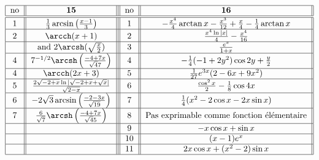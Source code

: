 \[ \begin{tabular}{| c || c || | c | | c | | }
\hline       no &         ${\bf 15}                                          $                                   &  no    &  ${\bf 16}  $                                                                                              \\    \hline \hline
             $1$   &      $      \frac{1}{3}\arcsin \left(\frac{x-1}{3}\right)                  $          & $1$  &  $ -\frac{x^4}{4} \arctan x - \frac{x^3}{12}+\frac{x}{4}-\frac{1}{4}\arctan x$    \\ \hline 
            $2$   &      $      \arcch(x+1)              $                                                     & $2$  &  $\frac{x^4\ln| x|}{4}-\frac{x^4}{16} $          						\\ \hline
                      &   and           $   2\arcsh(\sqrt{\frac{x}{2}}) $         			        & $3$  &  $\frac{e^x}{1+x}$       									\\ \hline 
           $4$   &        $  7^{-1/2}\arcsh\left( \frac{-4+7x}{\sqrt 47} \right)               $                               &  $4$ &  $-\frac{1}{4}(-1+2y^2)\cos 2y + \frac{y}{2}$    					\\ \hline 
         $4$   &      $ \arcch(2x+3)     $       							&  $5$ &  $\frac{1}{27}e^{3x}(2-6x+9x^2)$       				 \\ \hline
           $5$&       $\frac{2\sqrt{-2+x} \ln |\sqrt{-2 + x} +\sqrt{x}| }{\sqrt{2-x}}   $               & $6$  &  $\frac{\cos^2 x}{2}-\frac{1}{8}\cos 4x $        \\ \hline
            $6$   &      $-2\sqrt{3}\arcsin\left(\frac{-2-3x}{\sqrt{19}}\right)$                & $7$  &  $\frac{1}{4}(x^2-2\cos x -2x\sin x) $                \\ \hline
                $7$      &       			     $\frac{6}{\sqrt{7}}\arcsh\left(\frac{-4+7x}{\sqrt 45}\right)$                                                                      & $8$  &  Pas exprimable comme fonction élémentaire             \\ \hline
                   &       			                                                                         & $9$  &   $-x\cos x +\sin x$           \\ \hline
                    &       			                                                                         & $10$ &  $(x-1)e^x$            \\ \hline
                    &       			                                                                         & $11$ &  $2x\cos x + (x^2-2)\sin x$            \\ \hline
  \end{tabular} \]

